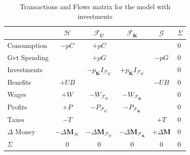 \begin{table}
    \centering
    \begin{tabular}{l|cccc|l}

                       & $\mathcal{H}$                   & $\mathcal{F}_\mathbf{C}$                     & $\mathcal{F}_\mathbf{K}$                     & $\mathcal{G}$       & $\Sigma$ \\
        \midrule
        Consumption    & $-p C$                          & $+p C$                                       &                                              &                     & 0        \\
        Gvt Spending   &                                 & $+p G$                                       &                                              & $-p G$              & 0        \\
        Investments    &                                 & $-p_\mathbf{K} I_{\mathcal{F}_\mathbf{C}} $  & $+p_\mathbf{K} I_{\mathcal{F}_\mathbf{C}} $  &                     & 0        \\
        Benefits       & $+UB$                           &                                              &                                              & $-UB$               & 0        \\
        Wages          & $+W$                            & $-W_{\mathcal{F}_\mathbf{C}}$                & $-W_{\mathcal{F}_\mathbf{K}}$                &                     & 0        \\
        Profits        & $+P$                            & $-P_{\mathcal{F}_\mathbf{C}}$                & $-P_{\mathcal{F}_\mathbf{K}}$                &                     & 0        \\
        Taxes          &
        $-T$           &                                 &                                              & $+T$                                         & 0                              \\
        \midrule
        $\Delta$ Money & $-\Delta\mathbf{M}_\mathcal{H}$ & $-\Delta\mathbf{M}_{\mathcal{F}_\mathbf{C}}$ & $-\Delta\mathbf{M}_{\mathcal{F}_\mathbf{K}}$ & $+\Delta\mathbf{M}$ & 0        \\
        \midrule
        $\Sigma$       & 0                               & 0                                            & 0                                            & 0                   & 0        \\
    \end{tabular}
    \caption{Transactions and Flows matrix for the model with investments}
\end{table}

